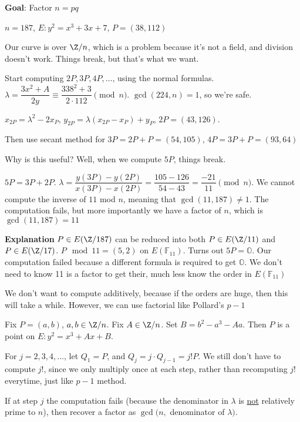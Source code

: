 \documentclass[twoside, 10pt]{article}
\newcommand{\F}{\mathbb{F}}
\renewcommand{\O}{\mathbb{O}}
\begin{document}
\textbf{Goal}: Factor $n = pq$

\begin{exm*}
    $n = 187$, $E: y^2 = x^3 + 3x + 7$, $P = (38, 112)$
\end{exm*}
Our curve is over $\Z/n$, which is a problem because it's not a field, and division doesn't work. Things break, but that's what we want.

Start computing $2P, 3P, 4P, \ldots$, using the normal formulas. $\lambda = \dfrac{3x^2 + A}{2y} \equiv \dfrac{338^2 + 3}{2\cdot 112} \pmod{n}$. $\gcd(224, n) = 1$, so we're safe.

$x_{2P} = \lambda^2 - 2x_P$, $y_{2P} = \lambda(x_{2P}-x_P) + y_P$, $2P = (43, 126)$.

Then use secant method for $3P = 2P + P = (54, 105)$, $4P = 3P + P = (93, 64)$

Why is this useful? Well, when we compute $5P$, things break.

$5P = 3P + 2P$. $\lambda = \dfrac{y(3P) - y(2P)}{x(3P) - x(2P)} = \dfrac{105-126}{54-43} = \dfrac{-21}{11} \pmod{n}$. We cannot compute the inverse of $11$ mod $n$, meaning that $\gcd(11, 187) \neq 1$. The computation fails, but more importantly we have a factor of $n$, which is $\gcd(11, 187) = 11$

\textbf{Explanation} $P \in E(\Z/187)$ can be reduced into both $P \in E(\Z/11)$ and $P \in E(\Z/17)$. $P \mod{11} = (5, 2)$ on $E(\F_{11})$. Turns out $5P = \O$. Our computation failed because a different formula is required to get $\O$. We don't need to know 11 is a factor to get their, much less know the order in $E(\F_11)$

\begin{rmk}
    We don't want to compute additively, because if the orders are huge, then this will take a while. However, we can use factorial like Pollard's $p-1$
\end{rmk}

Fix $P = (a, b)$, $a, b \in \Z/n$. Fix $A \in \Z/n$. Set $B = b^2 - a^3 -Aa$. Then $P$ is a point on $E: y^2 = x^3 + Ax + B$.

For $j = 2, 3, 4, \ldots$, let $Q_1 = P$, and $Q_j = j\cdot Q_{j-1} = j!P$. We still don't have to compute $j!$, since we only multiply once at each step, rather than recomputing $j!$ everytime, just like $p-1$ method.

If at step $j$ the computation fails (because the denominator in $\lambda$ is \underline{not} relatively prime to $n$), then recover a factor as $\gcd(n,$ denominator of $\lambda)$. 
\end{document}

